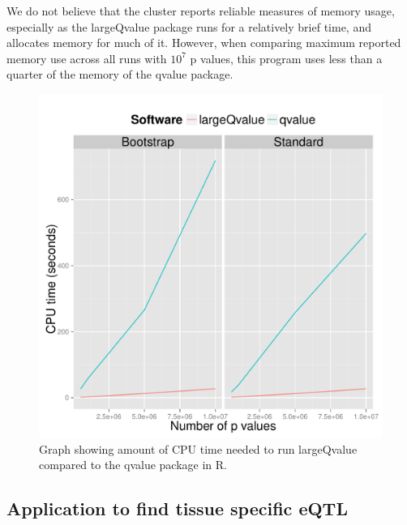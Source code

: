 \documentclass{amsart}
\begin{document}
We do not believe that the cluster reports reliable measures of memory usage, especially as the largeQvalue package runs for a relatively brief time, and allocates memory for much of it. However, when comparing maximum reported memory use across all runs with $10^7$ p values, this program uses less than a quarter of the memory of the qvalue package.

\begin{figure}
  \centering
  \includegraphics[width=\textwidth]{Timings}
  \caption{Graph showing amount of CPU time needed to run largeQvalue compared to the qvalue package in R.}
  \label{fig:time}
\end{figure}

\subsection{Application to find tissue specific eQTL}
\end{document}
